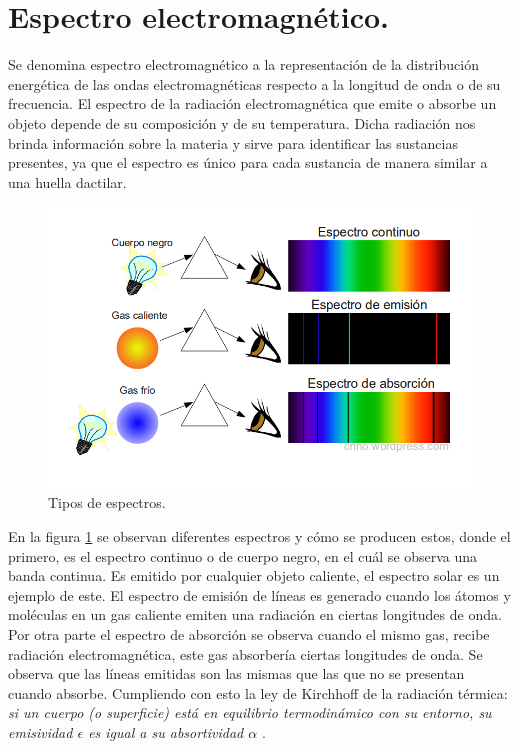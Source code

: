 \section{Espectro electromagnético.}
Se denomina espectro electromagnético a la representación de la distribución energética de las ondas electromagnéticas respecto a la longitud de onda o de su frecuencia. El espectro de la radiación electromagnética que emite o absorbe un objeto depende de su composición y de su temperatura. Dicha radiación nos brinda información sobre la materia y sirve para identificar las sustancias presentes, ya que el espectro es único para cada sustancia de manera similar a una huella dactilar. 
\begin{figure}[h!] %
	\centering
	\includegraphics[width=1\linewidth]{Imagenes/espectros_absorcion_y_emision}
	\caption{Tipos de espectros. \cite{FisicaCh}}
	\label{fig:esq_espectro01}
\end{figure}

En la figura \ref{fig:esq_espectro01} se observan diferentes espectros y cómo se producen estos, donde el primero, es el espectro continuo o de cuerpo negro, en el cuál se observa una banda continua. Es emitido por cualquier objeto caliente, el espectro solar es un ejemplo de este. El espectro de emisión de líneas es generado cuando los átomos y moléculas en un gas caliente emiten una radiación en ciertas longitudes de onda. Por otra parte el espectro de absorción se observa cuando el mismo gas, recibe radiación electromagnética, este gas absorbería ciertas longitudes de onda. Se observa que las líneas emitidas son las mismas que las que no se presentan cuando absorbe. Cumpliendo con esto la ley de Kirchhoff de la radiación térmica: \emph{si un cuerpo (o superficie) está en equilibrio termodinámico con su entorno, su emisividad $\epsilon$ es igual a su absortividad $\alpha$} .

